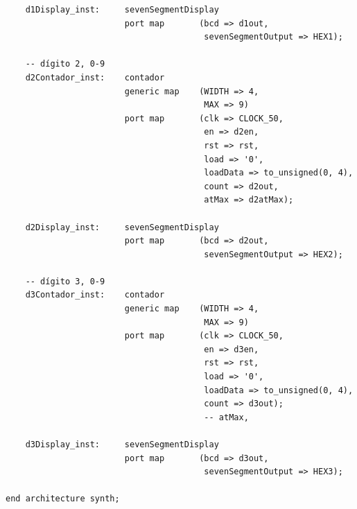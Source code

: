 \documentclass[a4paper]{article}
\begin{document}
\begin{verbatim}
    d1Display_inst:     sevenSegmentDisplay
                        port map       (bcd => d1out,
                                        sevenSegmentOutput => HEX1);

    -- dígito 2, 0-9
    d2Contador_inst:    contador
                        generic map    (WIDTH => 4,
                                        MAX => 9)
                        port map       (clk => CLOCK_50,
                                        en => d2en,
                                        rst => rst,
                                        load => '0',
                                        loadData => to_unsigned(0, 4),
                                        count => d2out,
                                        atMax => d2atMax);

    d2Display_inst:     sevenSegmentDisplay
                        port map       (bcd => d2out,
                                        sevenSegmentOutput => HEX2);

    -- dígito 3, 0-9
    d3Contador_inst:    contador
                        generic map    (WIDTH => 4,
                                        MAX => 9)
                        port map       (clk => CLOCK_50,
                                        en => d3en,
                                        rst => rst,
                                        load => '0',
                                        loadData => to_unsigned(0, 4),
                                        count => d3out);
                                        -- atMax,

    d3Display_inst:     sevenSegmentDisplay
                        port map       (bcd => d3out,
                                        sevenSegmentOutput => HEX3);

end architecture synth;
\end{verbatim}
\end{document}
